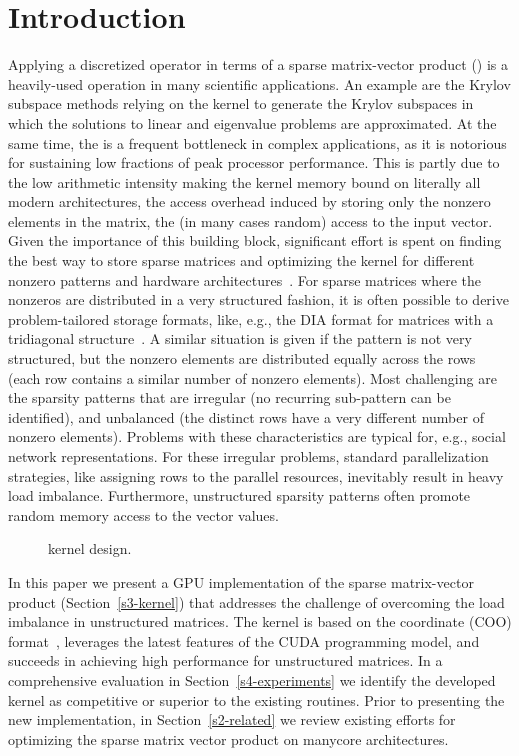 \section{Introduction}
\label{s1-intro}
Applying a discretized operator
in terms of a sparse matrix-vector product (\spmv)
is a heavily-used operation in many scientific applications.
An example are the Krylov subspace methods relying on the \spmv kernel
to generate the Krylov subspaces in which the solutions
to linear and eigenvalue problems are approximated.
At the same time, the \spmv is a frequent bottleneck in complex applications,
as it is notorious for sustaining low fractions of peak processor performance.
This is partly due to the low arithmetic intensity making the 
\spmv kernel memory bound on literally all modern architectures,
the access overhead induced by storing only the nonzero elements in the matrix,
the (in many cases random) access to the input vector.
Given the importance of this building block,
significant effort is spent on finding the best way to store
sparse matrices and optimizing the \spmv kernel for
different nonzero patterns and hardware architectures~\cite{garlandspmv,sellpreport,Liu:2015:CES:2751205.2751209}.
For sparse matrices where the nonzeros are distributed in a very 
structured fashion, it is often possible to derive problem-tailored 
storage formats, like, e.g., the DIA format for matrices with a tridiagonal structure~\cite{garlandspmv}.
A similar situation is given if the pattern is not very structured, but the nonzero elements 
are distributed equally across the rows (each row contains 
a similar number of nonzero elements). 
Most challenging are the 
sparsity patterns that are irregular (no recurring sub-pattern can be identified),
and unbalanced (the distinct rows have a very different number of nonzero elements).
Problems with these characteristics are typical for, e.g., social network representations.
For these irregular problems, standard parallelization strategies, 
like assigning rows to the parallel resources,
inevitably result in heavy load imbalance.
Furthermore, unstructured sparsity patterns often promote 
random memory access to the vector values.

\begin{figure}
\begin{minipage}{\columnwidth}

\end{minipage}
\caption{\coo \spmv kernel design.}
\label{2017-coo-spmv:fig:spmv}
\end{figure}

In this paper we present
a GPU implementation 
of the sparse matrix-vector product (Section~\ref{s3-kernel})
that addresses the challenge of overcoming the load imbalance in unstructured
matrices. The kernel is based on the coordinate (COO) format~\cite{garlandspmv}, 
leverages the latest features of the CUDA programming model,
and succeeds in achieving high performance for unstructured matrices.
In a comprehensive evaluation in Section~\ref{s4-experiments} 
we identify the developed kernel as competitive or superior
to the existing routines.
Prior to presenting the new implementation, in Section~\ref{s2-related} we
review
existing efforts for optimizing the sparse matrix vector product
on manycore architectures.
